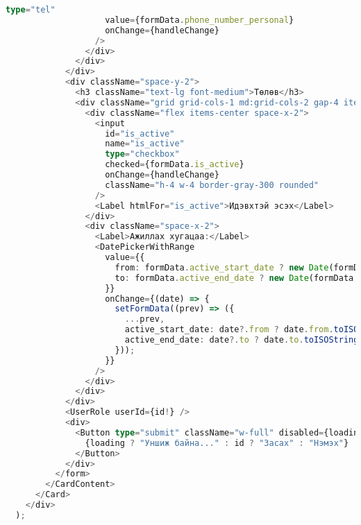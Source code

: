 \begin{lstlisting}[language=Typescript, caption=UI бүтэц, frame=single]
                    type="tel"
                    value={formData.phone_number_personal}
                    onChange={handleChange}
                  />
                </div>
              </div>
            </div>
            <div className="space-y-2">
              <h3 className="text-lg font-medium">Төлөв</h3>
              <div className="grid grid-cols-1 md:grid-cols-2 gap-4 items-center">
                <div className="flex items-center space-x-2">
                  <input
                    id="is_active"
                    name="is_active"
                    type="checkbox"
                    checked={formData.is_active}
                    onChange={handleChange}
                    className="h-4 w-4 border-gray-300 rounded"
                  />
                  <Label htmlFor="is_active">Идэвхтэй эсэх</Label>
                </div>
                <div className="space-x-2">
                  <Label>Ажиллах хугацаа:</Label>
                  <DatePickerWithRange
                    value={{
                      from: formData.active_start_date ? new Date(formData.active_start_date) : undefined,
                      to: formData.active_end_date ? new Date(formData.active_end_date) : undefined,
                    }}
                    onChange={(date) => {
                      setFormData((prev) => ({
                        ...prev,
                        active_start_date: date?.from ? date.from.toISOString(): "",
                        active_end_date: date?.to ? date.to.toISOString() : "",
                      }));
                    }}
                  />
                </div>
              </div>
            </div>
            <UserRole userId={id!} />
            <div>
              <Button type="submit" className="w-full" disabled={loading}>
                {loading ? "Уншиж байна..." : id ? "Засах" : "Нэмэх"}
              </Button>
            </div>
          </form>
        </CardContent>
      </Card>
    </div>
  );
\end{lstlisting}
\pagebreak